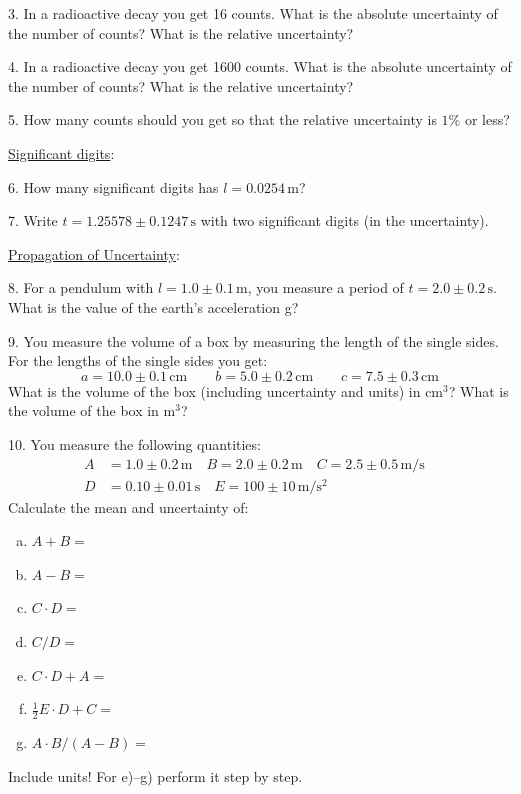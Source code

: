 \documentclass{article}
\begin{document}
3. In a radioactive decay you get 16 counts. What is the absolute uncertainty of the number of counts? What is the relative uncertainty? \myskip

4. In a radioactive decay you get 1600 counts. What is the absolute uncertainty of the number of counts? What is the relative uncertainty? \myskip

5. How many counts should you get so that the relative uncertainty is $1\%$ or less? \myskip

\noindent \underline{Significant digits}: \myskip

6. How many significant digits has $l = 0.0254\,\mathrm{m}$? \myskip

7. Write $t = 1.25578 \pm 0.1247\,\mathrm{s}$ with two significant digits (in the uncertainty). \myskip

\noindent \underline{Propagation of Uncertainty}: \myskip

8. For a pendulum with $l = 1.0 \pm 0.1\,\mathrm{m}$, you measure a period of $t = 2.0 \pm 0.2\,\mathrm{s}$. What is the value of the earth's acceleration g? \myskip

9. You measure the volume of a box by measuring the length of the single sides. For the lengths of the single sides you get:
\begin{equation*}
    a = 10.0 \pm 0.1\,\mathrm{cm}\qquad    b = 5.0 \pm 0.2\,\mathrm{cm} \qquad c = 7.5 \pm 0.3\,\mathrm{cm}
\end{equation*}
What is the volume of the box (including uncertainty and units) in $\mathrm{cm}^3$? What is the volume of the box in $\mathrm{m}^3$? \myskip

10. You measure the following quantities:
\begin{align*}
    A &= 1.0 \pm 0.2\,\mathrm{m}\quad B = 2.0 \pm 0.2\,\mathrm{m}\quad        C = 2.5 \pm 0.5\,\mathrm{m/s} \\ 
    D &= 0.10\pm 0.01\,\mathrm{s}\quad E = 100\pm 10\,\mathrm{m/s^2} &
\end{align*}
Calculate the mean and uncertainty of:
\begin{enumerate}[a)]
    \item $A+B=$
    \item $A-B=$
    \item $C\cdot D=$
    \item $C/D=$
    \item $C\cdot D + A=$
    \item $\frac{1}{2}E\cdot D + C=$
    \item $A\cdot B/(A-B)=$
\end{enumerate}
Include units! For e)--g) perform it step by step.\myskip
\end{document}
